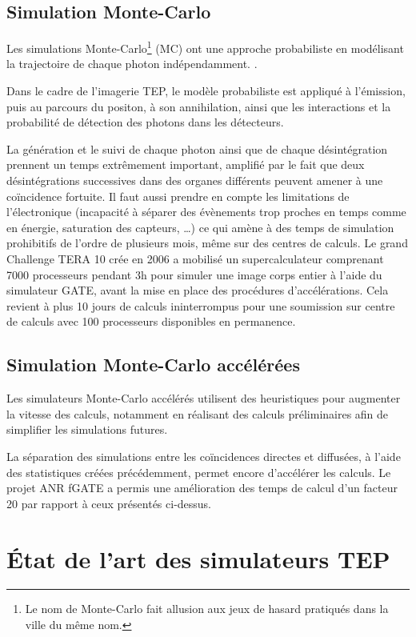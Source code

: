 		\subsection{Simulation Monte-Carlo}

Les simulations Monte-Carlo\footnote{Le nom de Monte-Carlo fait allusion aux jeux de hasard pratiqués dans la ville du même nom.} (MC) ont une approche probabiliste en modélisant la trajectoire de chaque photon indépendamment. .

Dans le cadre de l'imagerie TEP, le modèle probabiliste est appliqué à l'émission, puis au parcours du positon, à son annihilation, ainsi que les interactions et la probabilité de détection des photons dans les détecteurs.

La génération et le suivi de chaque photon ainsi que de chaque désintégration prennent un temps extrêmement important, amplifié par le fait que deux désintégrations successives dans des organes différents peuvent amener à une coïncidence fortuite. Il faut aussi prendre en compte les limitations de l'électronique (incapacité à séparer des évènements trop proches en temps comme en énergie, saturation des capteurs, \dots) ce qui amène à des temps de simulation prohibitifs de l'ordre de plusieurs mois, même sur des centres de calculs. Le grand Challenge TERA 10 crée en 2006 a mobilisé un supercalculateur comprenant 7000 processeurs pendant 3h pour simuler une image corps entier à l'aide du simulateur GATE, avant la mise en place des procédures d'accélérations. Cela revient à plus 10 jours de calculs ininterrompus pour une soumission sur centre de calculs avec 100 processeurs disponibles en permanence.

	\subsection{Simulation Monte-Carlo accélérées}

Les simulateurs Monte-Carlo accélérés utilisent des heuristiques pour augmenter la vitesse des calculs, notamment en réalisant des calculs préliminaires afin de simplifier les simulations futures. 

La séparation des simulations entre les coïncidences directes et diffusées, à l’aide des statistiques créées précédemment, permet encore d’accélérer les calculs. Le projet ANR fGATE a permis une amélioration des temps de calcul d'un facteur 20 par rapport à ceux présentés ci-dessus.

	\section{\'Etat de l'art des simulateurs TEP}

